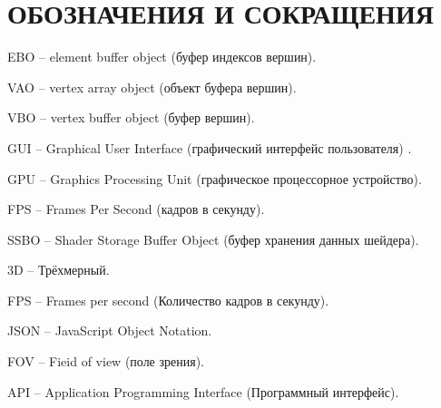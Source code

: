 \section*{ОБОЗНАЧЕНИЯ И СОКРАЩЕНИЯ}

EBO -- element buffer object (буфер индексов вершин).

VAO -- vertex array object (объект буфера вершин).

VBO -- vertex buffer object (буфер вершин).

GUI -- Graphical User Interface (графический интерфейс пользователя) .

GPU -- Graphics Processing Unit (графическое процессорное устройство).

FPS -- Frames Per Second (кадров в секунду).

SSBO -- Shader Storage Buffer Object (буфер хранения данных шейдера).

3D -- Трёхмерный.

FPS -- Frames per second (Количество кадров в секунду).

JSON -- JavaScript Object Notation.

FOV -- Fieid of view (поле зрения).

API -- Application Programming Interface (Программный интерфейс).
